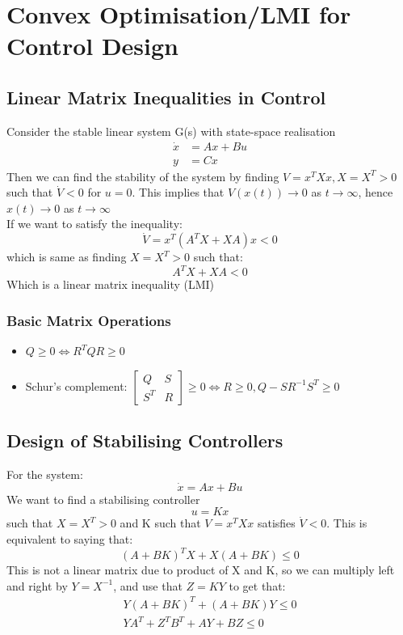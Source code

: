 \documentclass{article}
\begin{document}
\section{Convex Optimisation/LMI for Control Design}
\subsection{Linear Matrix Inequalities in Control}
Consider the stable linear system G(s) with state-space realisation
\[
\begin{aligned}
    \dot x &= Ax+Bu \\
    y &= Cx
\end{aligned}
\]
Then we can find the stability of the system by finding $V = x^TXx, X=X^T > 0$ such that $\dot V < 0$ for $u=0$. This implies that $V(x(t)) \rightarrow 0$ as $t \rightarrow \infty$, hence $x(t) \rightarrow 0$ as $t \rightarrow \infty$ \\
If we want to satisfy the inequality:
\[
\dot V = x^T(A^TX + XA)x < 0
\]
which is same as finding $X=X^T > 0$ such that:
\[
A^TX + XA < 0
\]
Which is a linear matrix inequality (LMI)
\subsubsection*{Basic Matrix Operations}
\begin{itemize}
    \item $Q \geq 0 \iff R^TQR \geq 0$ 
    \item Schur's complement: $ \begin{bmatrix}
        Q & S \\ S^T & R
    \end{bmatrix} \geq 0 \iff R \geq 0, Q-SR^{-1}S^T \geq 0$
\end{itemize}
\subsection{Design of Stabilising Controllers}
For the system:
\[
\dot x = Ax + Bu
\]
We want to find a stabilising controller
\[
u = Kx
\]
such that $X = X^T > 0$ and K such that $V = x^T X x$ satisfies $\dot V < 0$. This is equivalent to saying that:
\[
(A+BK)^TX + X(A+BK) \leq 0
\]
This is not a linear matrix due to product of X and K, so we can multiply left and right by $Y = X^{-1}$, and use that $Z = KY$ to get that:
\[
\begin{aligned}
    Y(A+BK)^T + (A+BK)Y \leq 0 \\
    YA^T + Z^TB^T + AY+BZ \leq 0
\end{aligned}
\]
\end{document}
